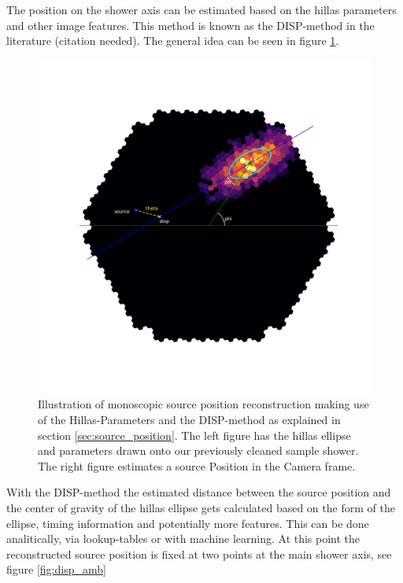 The position on the shower axis can be estimated based on 
the hillas parameters and other image features.
This method is known as the DISP-method in the
literature (citation needed). The general idea 
can be seen in figure \ref{fig:disp}.

\begin{figure}
    \includegraphics[width=0.9\linewidth]{Plots/hillas_complete.pdf}
    \caption{Illustration of monoscopic source position reconstruction making use of 
        the Hillas-Parameters and the DISP-method as explained in section \ref{sec:source_position}.
        The left figure has the hillas ellipse and parameters drawn onto our previously cleaned sample shower.
        The right figure estimates a source Position in the Camera frame.}
    \label{fig:disp}
\end{figure}

With the DISP-method the estimated distance between the source
position and the center of gravity of the hillas ellipse gets calculated
based on the form of the ellipse, timing information and potentially
more features.
This can be done analitically, via lookup-tables or with machine learning.
At this point the reconstructed source position
is fixed at two points at the main shower axis, see figure \ref{fig:disp_amb}


